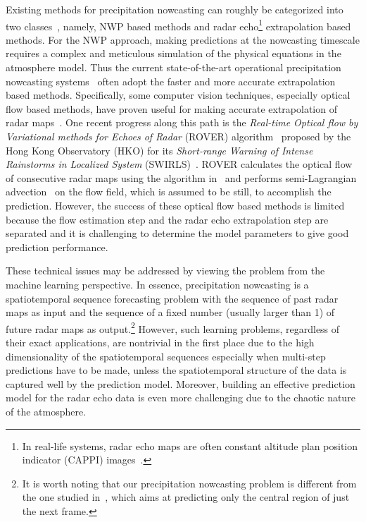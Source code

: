 \documentclass{article} \usepackage{amsmath}
\begin{document}
Existing methods for precipitation nowcasting can roughly be categorized into two classes~\cite{sun2014use}, namely, NWP based methods and radar echo\footnote{In real-life systems, radar echo maps are often constant altitude plan position indicator (CAPPI) images~\cite{douglas1990stormy}.} extrapolation based methods. For the NWP approach, making predictions at the nowcasting timescale requires a complex and meticulous simulation of the physical equations in the atmosphere model. Thus the current state-of-the-art operational precipitation nowcasting systems~\cite{reyniers2008quantitative,cheung2012application} often adopt the faster and more accurate extrapolation based methods. Specifically, some computer vision techniques, especially optical flow based methods, have proven useful for making accurate extrapolation of radar maps~\cite{germann2002scale,cheung2012application,DBLP:journals/tgrs/Sakaino13}. One recent progress along this path is the \emph{Real-time Optical flow by Variational methods for Echoes of Radar} (ROVER) algorithm~\cite{wang2014application} proposed by the Hong Kong Observatory (HKO) for its \emph{Short-range Warning of Intense Rainstorms in Localized System} (SWIRLS)~\cite{li2000swirls}. ROVER calculates the optical flow of consecutive radar maps using the algorithm in~\cite{brox2004high} and performs semi-Lagrangian advection~\cite{bridson2008fluid} on the flow field, which is assumed to be still, to accomplish the prediction. However, the success of these optical flow based methods is limited because the flow estimation step and the radar echo extrapolation step are separated and it is challenging to determine the model parameters to give good prediction performance.

These technical issues may be addressed by viewing the problem from the machine learning perspective.  In essence, precipitation nowcasting is a spatiotemporal sequence forecasting problem with the sequence of past radar maps as input and the sequence of a fixed number (usually larger than 1) of future radar maps as output.\footnote{It is worth noting that our precipitation nowcasting problem is different from the one studied in~\cite{klein2015dynamic}, which aims at predicting only the central region of just the next frame.}
However, such learning problems, regardless of their exact applications, are nontrivial in the first place due to the high dimensionality of the spatiotemporal sequences especially when multi-step predictions have to be made, unless the spatiotemporal structure of the data is captured well by the prediction model.  Moreover, building an effective prediction model for the radar echo data is even more challenging due to the chaotic nature of the atmosphere.
\end{document}

